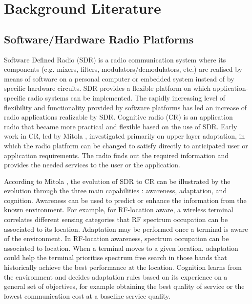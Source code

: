 \chapter{Background Literature}
\label{chap:BackgroundLiterature}

\section{Software/Hardware Radio Platforms}
Software Defined Radio (SDR) is a radio communication system where its components (e.g. mixers, filters, modulators/demodulators, etc.) are realised by means of software on a personal computer or embedded system instead of by specific hardware circuits.
SDR provides a flexible platform on which application-specific radio systems can be implemented. The rapidly increasing level of flexibility and functionality provided by software platforms has led an increase of radio applications realizable by SDR. 
Cognitive radio (CR) is an application radio that became more practical and flexible based on the use of SDR.
Early work in CR, led by Mitola \cite{Mitola1999}, investigated primarily on upper layer adaptation, in which the radio platform can be changed to satisfy directly to anticipated user or application requirements. The radio finds out the required information and provides the needed services to the user or the application.

According to Mitola \cite{Mitola2006}, the evolution of SDR to CR can be illustrated by the evolution through the three main capabilities \cite{Recio2010a}: awareness, adaptation, and cognition. 
Awareness can be used to predict or enhance the information from the known environment. For example, for RF-location aware, a wireless terminal correlates different sensing categories that RF spectrum occupation can be associated to its location.
Adaptation may be performed once a terminal is aware of the environment. In RF-location awareness, spectrum occupation can be associated to location. When a terminal moves to a given location, adaptation could help the terminal prioritise spectrum free search in those bands that historically achieve the best performance at the location.
Cognition learns from the environment and decides adaptation rules based on its experience on a general set of objectives, for example obtaining the best quality of service or the lowest communication cost at a baseline service quality.

